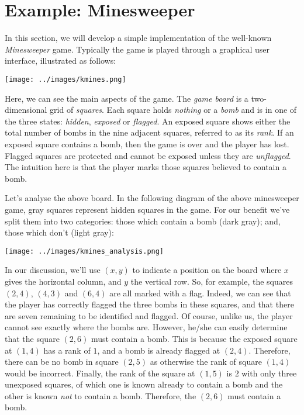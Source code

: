 \newpage
\section{Example: Minesweeper}
In this section, we will develop a simple implementation of the well-known {\em Minesweeper} game.  Typically the game is played through a graphical user interface, illustrated as follows:
\begin{center}
\texttt{[image: ../images/kmines.png]}
\end{center}
Here, we can see the main aspects of the game.  The {\em game board} is a two-dimensional grid of {\em squares}.  Each square holds {\em nothing} or a {\em bomb} and is in one of the three states: {\em hidden}, {\em exposed} or {\em flagged}.  An exposed square shows either the total number of bombs in the nine adjacent squares, referred to as its {\em rank}.  If an exposed square contains a bomb, then the game is over and the player has lost.  Flagged squares are protected and cannot be exposed unless they are {\em unflagged}.  The intuition here is that the player marks those squares believed to contain a bomb.  

Let's analyse the above board.  In the following diagram of the above minesweeper game, gray squares represent hidden squares in the game.  For our benefit we've split them into two categories: those which contain a bomb (dark gray); and, those which don't (light gray): 

\begin{center}
\texttt{[image: ../images/kmines\_analysis.png]}
\end{center}

In our discussion, we'll use $(x,y)$ to indicate a position on the board where $x$ gives the horizontal column, and $y$ the vertical row.  So, for example, the squares $(2,4)$, $(4,3)$ and $(6,4)$ are all marked with a flag.  Indeed, we can see that the player has correctly flagged the three bombs in these squares, and that there are seven remaining to be identified and flagged.  Of course, unlike us, the player cannot see exactly where the bombs are.  However, he/she can easily determine that the square $(2,6)$ must contain a bomb.  This is because the exposed square at $(1,4)$ has a rank of $1$, and a bomb is already flagged at $(2,4)$.  Therefore, there can be no bomb in square $(2,5)$ as otherwise the rank of square $(1,4)$ would be incorrect.  Finally, the rank of the square at $(1,5)$ is $2$ with only three unexposed squares, of which one is known already to contain a bomb and the other is known {\em not} to contain a bomb.  Therefore, the $(2,6)$ must contain a bomb.


